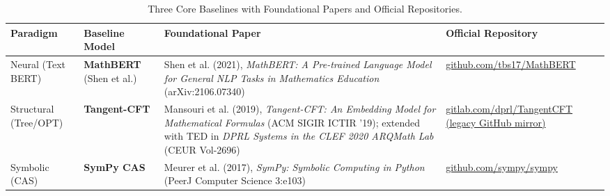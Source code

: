\documentclass[11pt,a4paper]{article}
\begin{document}
	\begin{table}[H]
		\centering
		\small
		\caption{Three Core Baselines with Foundational Papers and Official Repositories.}
		\label{tab:baselines}
		\begin{tabularx}{\textwidth}{p{2.6cm} p{2.4cm} X p{4.3cm}}
			\toprule
			\textbf{Paradigm} & \textbf{Baseline Model} & \textbf{Foundational Paper} & \textbf{Official Repository} \\
			\midrule
			Neural (Text BERT) & \textbf{MathBERT} (Shen et al.) & Shen et al. (2021), \textit{MathBERT: A Pre-trained Language Model for General NLP Tasks in Mathematics Education} (arXiv:2106.07340) & \href{https://github.com/tbs17/MathBERT}{\small github.com/tbs17/MathBERT} \\
			\addlinespace[4pt]
			Structural (Tree/OPT) & \textbf{Tangent-CFT} & Mansouri et al. (2019), \textit{Tangent-CFT: An Embedding Model for Mathematical Formulas} (ACM SIGIR ICTIR '19); extended with TED in \textit{DPRL Systems in the CLEF 2020 ARQMath Lab} (CEUR Vol-2696) & \href{https://gitlab.com/dprl/TangentCFT}{\small gitlab.com/dprl/TangentCFT} \newline \href{https://github.com/BehroozMansouri/TangentCFT}{\small (legacy GitHub mirror)} \\
			\addlinespace[4pt]
			Symbolic (CAS) & \textbf{SymPy CAS} & Meurer et al. (2017), \textit{SymPy: Symbolic Computing in Python} (PeerJ Computer Science 3:e103) & \href{https://github.com/sympy/sympy}{\small github.com/sympy/sympy} \\
			\bottomrule
		\end{tabularx}
	\end{table}
\end{document}
